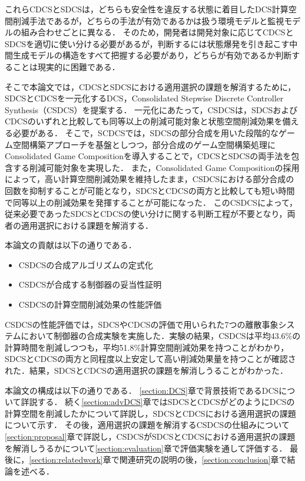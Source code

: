これらCDCSとSDCSは，どちらも安全性を違反する状態に着目したDCS計算空間削減手法であるが，どちらの手法が有効であるかは扱う環境モデルと監視モデルの組み合わせごとに異なる．
そのため，開発者は開発対象に応じてCDCSとSDCSを適切に使い分ける必要があるが，判断するには状態爆発を引き起こす中間生成モデルの構造をすべて把握する必要があり，どちらが有効であるか判断することは現実的に困難である．

そこで本論文では，CDCSとSDCSにおける適用選択の課題を解消するために，SDCSとCDCSを一元化するDCS，Consolidated Stepwise Discrete Controller Synthesis（CSDCS）を提案する．
一元化にあたって，CSDCSは，SDCSおよびCDCSのいずれと比較しても同等以上の削減可能対象と状態空間削減効果を備える必要がある．
そこで，SCDCSでは，SDCSの部分合成を用いた段階的なゲーム空間構築アプローチを基盤としつつ，部分合成のゲーム空間構築処理にConsolidated Game Compositionを導入することで，CDCSとSDCSの両手法を包含する削減可能対象を実現した．
また，Consolidated Game Compositionの採用によって，高い計算空間削減効果を維持したまま，CSDCSにおける部分合成の回数を抑制することが可能となり，SDCSとCDCSの両方と比較しても短い時間で同等以上の削減効果を発揮することが可能になった．
このCSDCSによって，従来必要であったSDCSとCDCSの使い分けに関する判断工程が不要となり，両者の適用選択における課題を解消する．

本論文の貢献は以下の通りである．
\begin{itemize}
	\item CSDCSの合成アルゴリズムの定式化
	\item CSDCSが合成する制御器の妥当性証明
	\item CSDCSの計算空間削減効果の性能評価
\end{itemize}
CSDCSの性能評価では，SDCSやCDCSの評価で用いられた7つの離散事象システムにおいて制御器の合成実験を実施した．実験の結果，CSDCSは平均43.6\%の計算時間を削減しつつも，平均51.8\%計算空間削減効果を持つことがわかり，SDCSとCDCSの両方と同程度以上安定して高い削減効果量を持つことが確認された．結果，SDCSとCDCSの適用選択の課題を解消しうることがわかった．

本論文の構成は以下の通りである．
\ref{section:DCS}章で背景技術であるDCSについて詳説する．
続く\ref{section:advDCS}章ではSDCSとCDCSがどのようにDCSの計算空間を削減したかについて詳説し，SDCSとCDCSにおける適用選択の課題について示す．
その後，適用選択の課題を解消するCSDCSの仕組みについて\ref{section:proposal}章で詳説し，CSDCSがSDCSとCDCSにおける適用選択の課題を解消しうるかについて\ref{section:evaluation}章で評価実験を通して評価する．
最後に，\ref{section:relatedwork}章で関連研究の説明の後，\ref{section:conclusion}章で結論を述べる．